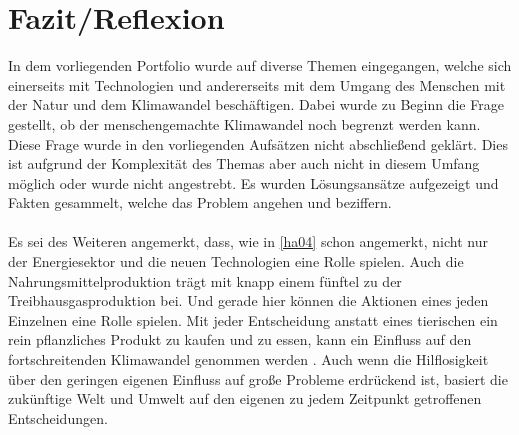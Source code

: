 \chapter{Fazit/Reflexion}
In dem vorliegenden Portfolio wurde auf diverse Themen eingegangen, welche sich einerseits mit Technologien und andererseits mit dem Umgang des Menschen mit der Natur und dem Klimawandel beschäftigen. Dabei wurde zu Beginn die Frage gestellt, ob der menschengemachte Klimawandel noch begrenzt werden kann. Diese Frage wurde in den vorliegenden Aufsätzen nicht abschließend geklärt. Dies ist aufgrund der Komplexität des Themas aber auch nicht in diesem Umfang möglich oder wurde nicht angestrebt. Es wurden Lösungsansätze aufgezeigt und Fakten gesammelt, welche das Problem angehen und beziffern.\\\\
Es sei des Weiteren angemerkt, dass, wie in \ref{ha04} schon angemerkt, nicht nur der Energiesektor und die neuen Technologien eine Rolle spielen. Auch die Nahrungsmittelproduktion trägt mit knapp einem fünftel zu der Treibhausgasproduktion bei. Und gerade hier können die Aktionen eines jeden Einzelnen eine Rolle spielen. Mit jeder Entscheidung anstatt eines tierischen ein rein pflanzliches Produkt zu kaufen und zu essen, kann ein Einfluss auf den fortschreitenden Klimawandel genommen werden \cite{poore_reducing_2018}. Auch wenn die Hilflosigkeit über den geringen eigenen Einfluss auf große Probleme erdrückend ist, basiert die zukünftige Welt und Umwelt auf den eigenen zu jedem Zeitpunkt getroffenen Entscheidungen.
